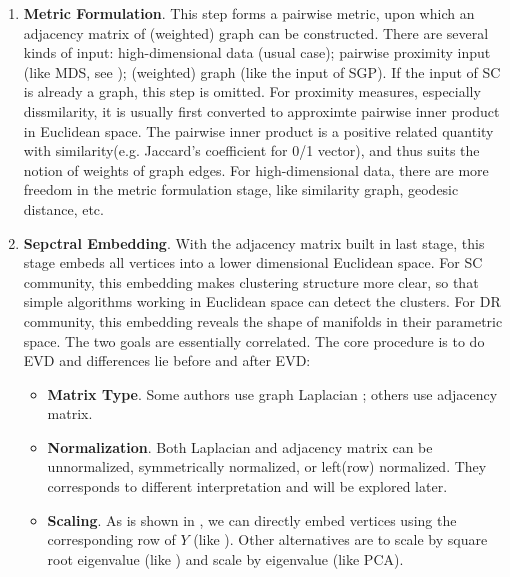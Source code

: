 \begin{enumerate}
	\item \textbf{Metric Formulation}. 
		This step forms a pairwise metric, upon which 
		an adjacency matrix of (weighted) graph can be 
		constructed. 
		There are several kinds of 
		input: high-dimensional data (usual case); pairwise proximity  
		input (like MDS, see \rsec{\ref{sec:mds}}); (weighted) graph
		(like the input of SGP). 
		If the input of SC is already a graph, 
		this step is omitted.
		For proximity measures, especially dissmilarity, it is 
		usually first converted to approximte pairwise inner product in 
		Euclidean space. The pairwise inner product is a positive 
		related quantity with similarity(e.g. Jaccard's coefficient 
		for 0/1 vector\cite{wiki_jaccard}), and thus suits the notion 
		of weights of graph edges. For high-dimensional data, there are 
		more freedom in the metric formulation stage, like 
		similarity graph\cite{von2007tutorial}, geodesic 
		distance\cite{tenenbaum2000isomap}, etc. 
	\item \textbf{Sepctral Embedding}. 
		With the adjacency matrix built in last stage, 
		this stage embeds all vertices into a lower dimensional 
		Euclidean space. For SC community, this embedding 
		makes clustering structure more clear, so that 
		simple algorithms working in Euclidean space can detect 
		the clusters. For DR community, this embedding reveals 
		the shape of manifolds in their parametric space. 
		The two goals are essentially correlated. The core procedure 
		is to do EVD and differences 
		lie before and after EVD:
			\begin{itemize}
				\item \textbf{Matrix Type}. Some authors use
					graph Laplacian
					\cite{von2007tutorial,belkin2003laplacian,shi2000normalized} ;
					others use \cite{ng2002spectral,brand2003unifying,kannan2004clusterings}
					adjacency matrix. 
				\item \textbf{Normalization}. Both Laplacian and 
					adjacency matrix can be unnormalized, symmetrically normalized, 
					or left(row) normalized\cite{von2007tutorial}. They corresponds to 
					different interpretation and will be explored later. 
				\item \textbf{Scaling}. 
					As is shown in \ralg{\ref{alg:sc_sample}}, we can directly 
					embed vertices using the corresponding row of $Y$
					(like \cite{ng2002spectral}). Other alternatives 
					are to scale by square root eigenvalue (like \cite{brand2003unifying})
					and scale by eigenvalue (like PCA\cite{bishop2006pattern}). 

\end{itemize}
\end{enumerate}
